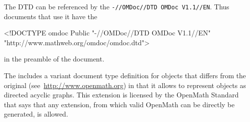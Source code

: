 \begin{appendix}
The DTD can be referenced by the {} {\tt{-//OMDoc//DTD OMDoc V1.1//EN}}. Thus
documents that use it have the {}

{\scriptsize\begin{boxedverbatim}
<!DOCTYPE omdoc Public "-//OMDoc//DTD OMDoc V1.1//EN" 
                       "http://www.mathweb.org/omdoc/omdoc.dtd"> 
\end{boxedverbatim}
}
in the preamble of the document. 

The {} includes
a variant document type definition for {\openmath} objects that differs from the
original (see~\url{http://www.openmath.org}) in that it allows to represent {\openmath} objects as
directed acyclic graphs. This extension is licensed by the OpenMath Standard that
says that any extension, from which valid OpenMath can be directly be generated,
is allowed.

{\scriptsize{}}
\end{appendix}

